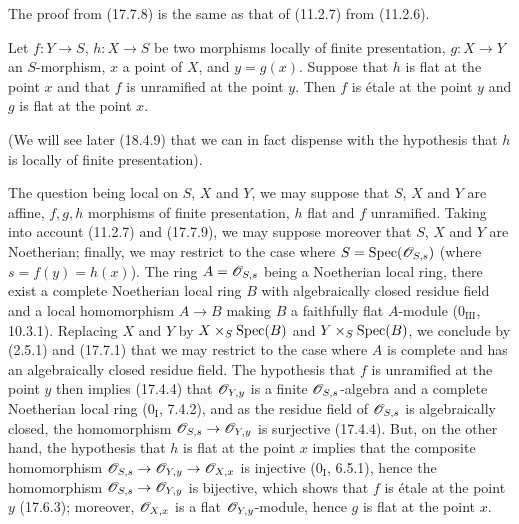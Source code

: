 The proof from (17.7.8) is the same as that of (11.2.7) from (11.2.6).

\begin{proposition}[17.7.10]
\label{IV.17.7.10}
Let $f:Y\to S$, $h:X\to S$ be two morphisms locally of finite presentation, $g:X\to Y$ an $S$-morphism, $x$ a point of $X$, and $y=g(x)$. Suppose that $h$ is flat at the point $x$ and that $f$ is unramified at the point $y$. Then $f$ is étale at the point $y$ and $g$ is flat at the point $x$.
\end{proposition}

(We will see later (18.4.9) that we can in fact dispense with the hypothesis that $h$ is locally of finite presentation).

The question being local on $S$, $X$ and $Y$, we may suppose that $S$, $X$ and $Y$ are affine, $f,g,h$ morphisms of finite presentation, $h$ flat and $f$ unramified. Taking into account (11.2.7) and (17.7.9), we may suppose moreover that $S$, $X$ and $Y$ are Noetherian; finally, we may restrict to the case where $S=\operatorname{Spec}(\mathscr{O}_{S,s})$ (where $s=f(y)=h(x)$). The ring $A=\mathscr{O}_{S,s}$ being a Noetherian local ring, there exist a complete Noetherian local ring $B$ with algebraically closed residue field and a local homomorphism $A\to B$ making $B$ a faithfully flat $A$-module ($0_{\mathrm{III}}$, 10.3.1). Replacing $X$ and $Y$ by $X\times_S\operatorname{Spec}(B)$ and $Y\times_S\operatorname{Spec}(B)$, we conclude by (2.5.1) and (17.7.1) that we may restrict to the case where $A$ is complete and has an algebraically closed residue field. The hypothesis that $f$ is unramified at the point $y$ then implies (17.4.4) that $\mathscr{O}_{Y,y}$ is a finite $\mathscr{O}_{S,s}$-algebra and a complete Noetherian local ring ($0_{\mathrm I}$, 7.4.2), and as the residue field of $\mathscr{O}_{S,s}$ is algebraically closed, the homomorphism $\mathscr{O}_{S,s}\to\mathscr{O}_{Y,y}$ is surjective (17.4.4). But, on the other hand, the hypothesis that $h$ is flat at the point $x$ implies that the composite homomorphism $\mathscr{O}_{S,s}\to\mathscr{O}_{Y,y}\to\mathscr{O}_{X,x}$ is injective ($0_{\mathrm I}$, 6.5.1), hence the homomorphism $\mathscr{O}_{S,s}\to\mathscr{O}_{Y,y}$ is bijective, which shows that $f$ is étale at the point $y$ (17.6.3); moreover, $\mathscr{O}_{X,x}$ is a flat $\mathscr{O}_{Y,y}$-module, hence $g$ is flat at the point $x$.

